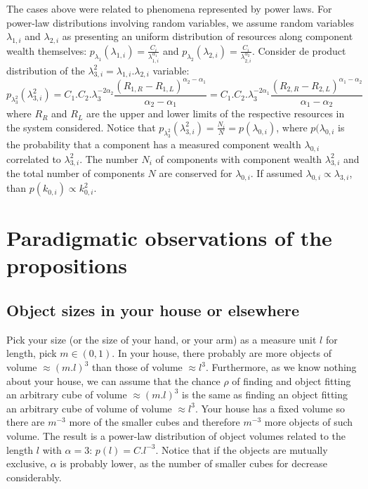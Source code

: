 \documentclass[a4paper, 11pt]{article} %
\begin{document}
The cases above were related to phenomena represented by power laws.
For power-law distributions involving random variables, we assume
random variables
$\lambda_{1,i}$ and $\lambda_{2,i}$ as presenting an uniform distribution of resources along component wealth
themselves:
$p_{\lambda_{1}}(\lambda_{1,i})=\frac{C_i}{\lambda_{1,i}^{\alpha_1}}$
and
$p_{\lambda_{2}}(\lambda_{2,i})=\frac{C_i}{\lambda_{2,i}^{\alpha_2}}$.
Consider de product distribution of the
$\lambda_{3,i}^2=\lambda_{1,i}.\lambda_{2,i}$
variable:
\begin{equation}
p_{\lambda_3^2}(\lambda_{3,i}^2)=C_1.C_2.\lambda_3^{-2\alpha_2}\frac{(R_{1,R}-R_{1,L})^{\alpha_2-\alpha_1}}{\alpha_2-\alpha_1}
=C_1.C_2.\lambda_3^{-2\alpha_1}\frac{(R_{2,R}-R_{2,L})^{\alpha_1-\alpha_2}}{\alpha_1-\alpha_2}
\end{equation}
where $R_R$ and $R_L$ are the upper and lower limits of the respective resources in the system considered.
Notice that $p_{\lambda_3^2}(\lambda_{3,i}^2)=\frac{N_i}{N}=p(\lambda_{0,i})$,
where $p(\lambda_{0,i}$ is the probability that a component has a measured
component wealth $\lambda_{0,i}$ correlated to $\lambda_{3,i}^2$. 
The number $N_i$ of components with component wealth $\lambda_{3,i}^2$ and the total
number of components $N$ are conserved for $\lambda_{0,i}$.
If assumed $\lambda_{0,i} \propto \lambda_{3,i}$, than
$p(k_{0,i}) \propto k_{0,i}^2$.


\section{Paradigmatic observations of the propositions}\label{sec:par}
\subsection{Object sizes in your house or elsewhere}\label{sec:siz}
Pick your size (or the size of your hand, or your arm)
as a measure unit $l$ for length, pick $m \in (0,1)$.
In your house, there probably are more objects
of volume $\approx (m.l)^3$ 
than those of volume $\approx l^3$.
Furthermore, as we know nothing about your house,
we can assume that the chance $\rho$ of finding and object
fitting an arbitrary cube of volume $\approx (m.l)^3$
is the same as finding an object fitting an
arbitrary cube of volume of volume $\approx l^3$.
Your house has a fixed volume so there are $m^{-3}$ more of
the smaller cubes and therefore $m^{-3}$ more objects of such
volume. 
The result is a power-law distribution of object volumes
related to the length $l$ with $\alpha=3$:
$p(l)=C.l^{-3}$.
Notice that if the objects are mutually exclusive,
$\alpha$ is probably lower, as the number of smaller
cubes for decrease considerably.
\end{document}
